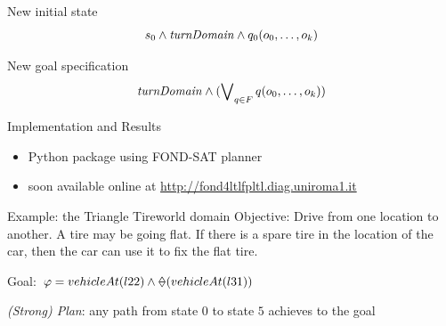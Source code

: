 \documentclass[10pt]{beamer}
\begin{document}
\begin{frame}{}
\begin{enumerate}
\begin{block}{\normalsize New initial state}
\[s_0 \wedge \text{\textit{turnDomain}} \wedge q_0(o_0,\dots,o_k)\]
\end{block}
\begin{block}{\normalsize New goal specification}
\[\text{\textit{turnDomain}} \wedge (\bigvee\nolimits_{q \in F}q(o_0,\dots,o_k))\]
\end{block}

\end{enumerate}
\end{frame}

\begin{frame}{Implementation and Results}
\begin{itemize}
\item \FONDFOR Python package using FOND-SAT planner
\item soon available online at \href{http://fond4ltlfpltl.diag.uniroma1.it}{http://fond4ltlfpltl.diag.uniroma1.it}
\end{itemize}

\begin{exampleblock}{Example: the Triangle Tireworld domain}
Objective: Drive from one location to another. A tire may be going flat. If there is a spare tire in the location of the car, then the car can use it to fix the flat tire.

Goal: $\varphi = vehicleAt(l22) \lAND \Once (vehicleAt(l31))$

\textit{(Strong) Plan}: any path from state $0$ to state $5$ achieves to the goal
\begin{figure}[h]
\centering
{}
\end{figure}

\end{exampleblock}


\end{frame}
\end{document}
